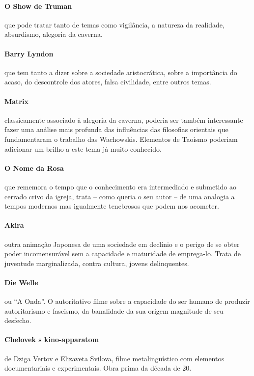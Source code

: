 \documentclass[12pt,a4paper]{article}
\begin{document}
	\paragraph{O Show de Truman} que pode tratar tanto de 
		temas como vigilância, a natureza da realidade,
		absurdismo, alegoria da caverna.

	\paragraph{Barry Lyndon} que tem tanto a dizer sobre a 
		sociedade aristocrática, sobre a importância do
		acaso, do descontrole dos atores, falsa 
		civilidade, entre outros temas.

	\paragraph{Matrix} classicamente associado à alegoria 
		da caverna, poderia ser também interessante 
		fazer uma análise mais profunda das influências 
		das filosofias orientais que fundamentaram o 
		trabalho das Wachowskis. Elementos de Taoismo 
		poderiam adicionar um brilho a este tema já 
		muito conhecido.

	\paragraph{O Nome da Rosa} que rememora o tempo que 
		o conhecimento era intermediado e submetido ao 
		cerrado crivo da igreja, trata -- como queria 
		o seu autor -- de uma analogia a tempos modernos 
		mas igualmente tenebrosos que podem nos acometer.

	\paragraph{Akira} outra animação Japonesa de uma 
		sociedade em declínio e o perigo de se obter 
		poder incomensurável sem a capacidade e 
		maturidade de emprega-lo. Trata de juventude 
		marginalizada, contra cultura, jovens 
		delinquentes.

	\paragraph{Die Welle} ou ``A Onda''. O autoritativo 
		filme sobre a capacidade do ser humano de 
		produzir autoritarismo e fascismo, da banalidade
		da sua origem magnitude de seu desfecho.

	\paragraph{Chelovek s kino-apparatom} de Dziga Vertov e
		Elizaveta Svilova, filme metalinguístico com 
		elementos documentariais e experimentais. Obra 
		prima da década de 20.
\end{document}
